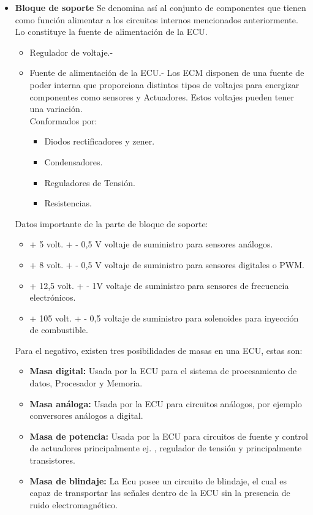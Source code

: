\begin{itemize}
\begin{itemize}
   \end{itemize}
    \item \textbf{Bloque de soporte}  Se denomina así al conjunto de componentes que tienen como función alimentar a los circuitos internos mencionados anteriormente. Lo constituye la fuente de alimentación de la ECU.
    \begin{itemize}
        \item Regulador de voltaje.-
        \item Fuente de alimentación de la ECU.- Los ECM disponen de una fuente de poder interna que proporciona distintos tipos de voltajes para energizar componentes como sensores y Actuadores. Estos voltajes pueden tener una variación.\\Conformados por:
        \begin{itemize}
            \item Diodos rectificadores y zener.
            \item Condensadores.
            \item Reguladores de Tensión.
            \item Resistencias.
        \end{itemize}
    \end{itemize}
    Datos importante de la parte de bloque de soporte:
    \begin{itemize}
        \item + 5 volt. + - 0,5 V voltaje de suministro para sensores análogos.
        \item + 8 volt. + - 0,5 V voltaje de suministro para sensores digitales o PWM.
        \item + 12,5 volt. + - 1V voltaje de suministro para sensores de frecuencia electrónicos.
        \item + 105 volt. + - 0,5 voltaje de suministro para solenoides para inyección de combustible.
    \end{itemize}
    Para el negativo, existen tres posibilidades de masas en una ECU, estas son: 
    \begin{itemize}
        \item \textbf{Masa digital:} Usada por la ECU para el sistema de procesamiento de datos, Procesador y Memoria.
        \item \textbf{Masa análoga:} Usada por la ECU para circuitos análogos, por ejemplo conversores análogos a digital.
        \item \textbf{Masa de potencia:} Usada por la ECU para circuitos de fuente y control de actuadores principalmente ej. , regulador de tensión y principalmente transistores.
        \item \textbf{Masa de blindaje:} La Ecu posee un circuito de blindaje, el cual es capaz de transportar las señales dentro de la ECU sin la presencia de ruido electromagnético.
    \end{itemize}
\end{itemize}

